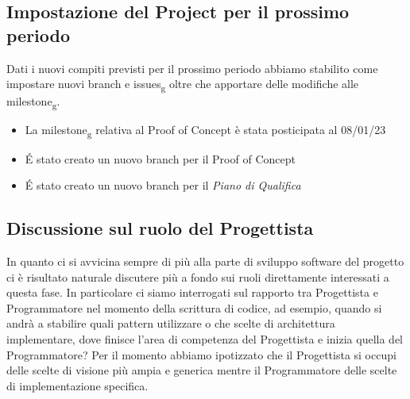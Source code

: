 \subsection{Impostazione del Project per il prossimo periodo}
Dati i nuovi compiti previsti per il prossimo periodo abbiamo stabilito come impostare nuovi branch e issues\textsubscript{g} oltre che apportare delle modifiche alle milestone\textsubscript{g}.
\begin{itemize}
	\item La milestone\textsubscript{g} relativa al Proof of Concept è stata posticipata al 08/01/23
	\item É stato creato un nuovo branch per il Proof of Concept
	\item É stato creato un nuovo branch per il \textit{Piano di Qualifica}
\end{itemize}

\subsection{Discussione sul ruolo del Progettista}
In quanto ci si avvicina sempre di più alla parte di sviluppo software del progetto ci è risultato naturale discutere più a fondo sui ruoli direttamente interessati a questa fase.
\newline In particolare ci siamo interrogati sul rapporto tra Progettista e Programmatore nel momento della scrittura di codice, ad esempio, quando si andrà a stabilire quali pattern utilizzare o che scelte di architettura implementare, dove finisce l'area di competenza del Progettista e inizia quella del Programmatore?
\newline Per il momento abbiamo ipotizzato che il Progettista si occupi delle scelte di visione più ampia e generica mentre il Programmatore delle scelte di implementazione specifica.